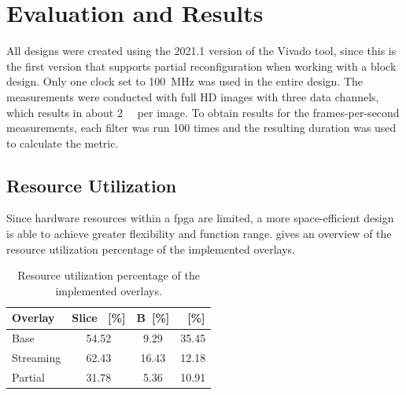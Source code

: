\documentclass{scrartcl}
\begin{document}
\section{Evaluation and Results}

All designs were created using the 2021.1 version of the Vivado tool, since this
is the first version that supports partial reconfiguration when working with a
block design. Only one clock set to \SI{100}{\mega\hertz} was used in the
entire design. The measurements were conducted with full HD images with three
data channels, which results in about \SI{2}{\mega\byte} per image. To obtain
results for the frames-per-second measurements, each filter was run \num{100}
times and the resulting duration was used to calculate the metric.


\subsection{Resource Utilization}

Since hardware resources within a \gls{fpga} are limited, a more space-efficient
design is able to achieve greater flexibility and function range.
 gives an overview of the resource utilization percentage of the
implemented overlays.

\begin{table}[h]
    \centering
    \begin{tabular}{l S S S}
        \toprule
        {Overlay} & {Slice }\ [\si{\percent}] &
        {B}\ [\si{\percent}] & {}\
        [\si{\percent}] \\
        \midrule
        Base        & 54.52 &  9.29 & 35.45 \\
        Streaming   & 62.43 & 16.43 & 12.18 \\
        Partial     & 31.78 &  5.36 & 10.91 \\
        \bottomrule
    \end{tabular}
    \caption{Resource utilization percentage of the implemented overlays.}%
    \label{tab:res}%
\end{table}
\end{document}
